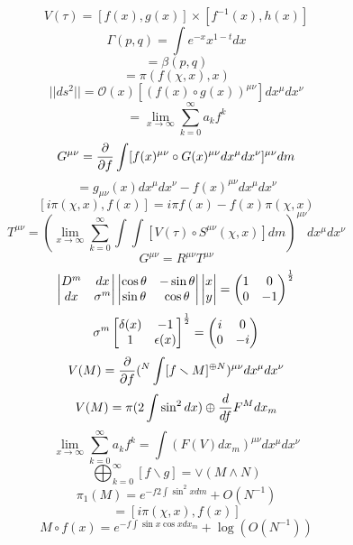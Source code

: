 \documentclass{jsarticle}
\begin{document}
{$$ V(\tau) = [f(x),g(x)] \times [f^{-1}(x), h(x)] $$
$$ \Gamma(p,q) = \int e^{-x} x^{1 - t}dx $$
$$ = \beta(p,q) $$
$$ = \pi (f(\chi,x),x) $$
$$ ||ds^2|| = \mathcal{O}(x)[(f(x) \circ g(x))^{\mu\nu}]dx^{\mu}dx^{\nu} $$
$$ = \lim_{x \to \infty} \sum_{k=0}^{\infty}a_k f^k $$
$$ G^{\mu\nu} = {\partial \over \partial f}\int [f(x)^{\mu\nu} \circ G(x)^{\mu\nu}dx^{\mu}dx^{\nu}]^{\mu\nu}dm $$
$$ = g_{\mu\nu}(x)dx^{\mu}dx^{\nu} - f(x)^{\mu\nu}dx^{\mu}dx^{\nu} $$
$$ [i \pi(\chi,x),f(x)] = i \pi f(x) - f(x) \pi(\chi,x) $$
$$ T^{\mu\nu} = (\lim_{x \to \infty} \sum_{k=0}^{\infty}\int \int [V(\tau) \circ S^{\mu\nu}(\chi,x)]dm)
^{\mu\nu}dx^{\mu}dx^{\nu} $$
$$ G^{\mu\nu} = R^{\mu\nu}T^{\mu\nu} $$
$$ \begin{vmatrix} D^m & dx \\
dx & \sigma^m \end{vmatrix} \begin{vmatrix} \cos \theta & - \sin \theta \\
\sin \theta & \cos \theta \end{vmatrix} \begin{vmatrix} x \\
y \end{vmatrix} = \begin{pmatrix} 1 & 0 \\ 
0 & - 1 \end{pmatrix}^{1 \over 2} $$
$$ \sigma^m \begin{bmatrix} \delta(x) & - 1 \\
1 & \epsilon(x) \end{bmatrix}^{1 \over 2} = \begin{pmatrix} i & 0 \\
0 & - i \end{pmatrix} $$
$$ V(M) = {\partial \over \partial f} ({}^N \int [f \smallsetminus M]^{\oplus N})^{\mu\nu} dx^{\mu}dx^{\nu} $$
$$ V(M) = \pi(2 \int \sin^2 dx)\oplus {d \over df}F^M dx_m $$
$$ \lim_{x \to \infty}\sum_{k=0}^{\infty} a_k f^k = \int (F(V)dx_m)^{\mu\nu}dx^{\mu}dx^{\nu} $$
$$ \bigoplus_{k=0}^{\infty}[ f \smallsetminus g] = \vee(M \wedge N) $$
$$ \pi_1 (M) = e^{-f 2 \int \sin^2 x dm} + O(N^{-1}) $$
$$ = [i \pi(\chi,x),f(x)] $$
$$ M \circ f(x) = e^{-f \int \sin x \cos x dx_m} + \log (O(N^{-1})) $$

}
\end{document}
